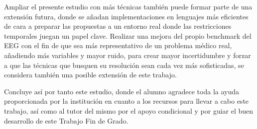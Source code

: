 Ampliar el presente estudio con más técnicas también puede formar parte de una extensión futura, donde se añadan implementaciones en lenguajes más eficientes de cara a preparar las propuestas a un entorno real donde las restricciones temporales juegan un papel clave. Realizar una mejora del propio benchmark del EEG con el fin de que sea más representativo de un problema médico real, añadiendo más variables y mayor ruido, para crear mayor incertidumbre y forzar a que las técnicas que busquen su resolución sean cada vez más sofisticadas, se considera también una posible extensión de este trabajo.

Concluye así por tanto este estudio, donde el alumno agradece toda la ayuda proporcionada por la institución en cuanto a los recursos para llevar a cabo este trabajo, así como al tutor del mismo por el apoyo condicional y por guiar el buen desarrollo de este Trabajo Fin de Grado.
